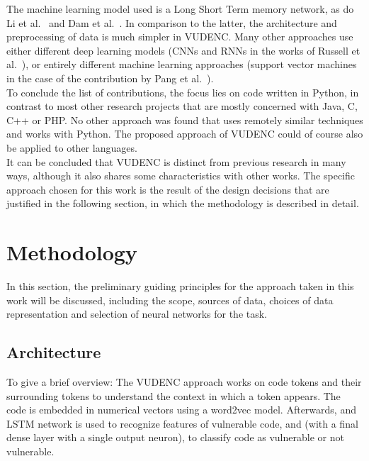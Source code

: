 \documentclass[
a4paper,
pagesize,
pdftex,
12pt,
twoside, %
BCOR=5mm, %
ngerman,
fleqn,
final,
]{scrartcl}
\begin{document}
	The machine learning model used is a Long Short Term memory network, as do Li et al.~\cite{Li.2018} and Dam et al.~\cite{Dam.2017}. In comparison to the latter, the architecture and preprocessing of data is much simpler in VUDENC. Many other approaches use either different deep learning models (CNNs and RNNs in the works of Russell et al.~\cite{Russell.2018}), or entirely different machine learning approaches (support vector machines in the case of the contribution by Pang et al.~\cite{Pang.2015}).\\
	To conclude the list of contributions, the focus lies on code written in Python, in contrast to most other research projects that are mostly concerned with Java, C, C++ or PHP. No other approach was found that uses remotely similar techniques and works with Python. The proposed approach of VUDENC could of course also be applied to other languages.\\
	It can be concluded that VUDENC is distinct from previous research in many ways, although it also shares some characteristics with other works. The specific approach chosen for this work is the result of the design decisions that are justified in the following section, in which the methodology is described in detail.
	
	
	\newpage
	\section{Methodology}\label{Methodology}
	In this section, the  preliminary guiding principles for the approach taken in this work will be discussed, including the scope, sources of data, choices of data representation and selection of neural networks for the task. 
	
	\subsection{Architecture}
	To give a brief overview: The VUDENC approach works on code tokens and their surrounding tokens to understand the context in which a token appears. The code is embedded in numerical vectors using a word2vec model. Afterwards, and LSTM network is used to recognize features of vulnerable code, and (with a final dense layer with a single output neuron), to classify code as vulnerable or not vulnerable.  
	
\end{document}
